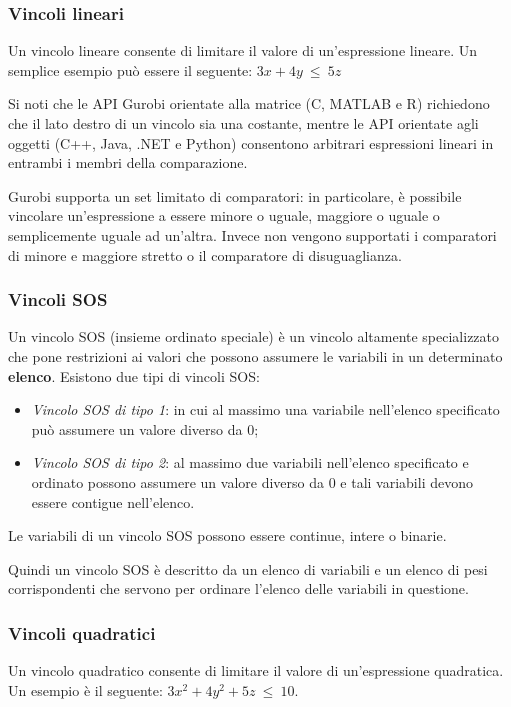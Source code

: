 \subsubsection*{Vincoli lineari}
Un vincolo lineare consente di limitare il valore di un'espressione lineare.
Un semplice esempio può essere il seguente:
$3x + 4y ~ \leq ~ 5z$

Si noti che le API Gurobi orientate alla matrice (C, MATLAB e R) richiedono che il lato destro di un vincolo sia una costante, mentre le API orientate agli oggetti (C++, Java, .NET e Python) consentono arbitrari espressioni lineari in entrambi i membri della comparazione.

Gurobi supporta un set limitato di comparatori: in particolare, è possibile vincolare un'espressione a essere minore o uguale, maggiore o uguale o semplicemente uguale ad un'altra. Invece non vengono supportati i comparatori di minore e maggiore stretto o il comparatore di disuguaglianza. 

\subsubsection*{Vincoli SOS}
Un vincolo SOS (insieme ordinato speciale) è un vincolo altamente specializzato che pone restrizioni ai valori che possono assumere le variabili in un determinato \textbf{elenco}.
Esistono due tipi di vincoli SOS:
\begin{itemize}
\item \textit{Vincolo SOS di tipo 1}: in cui al massimo una variabile nell'elenco specificato può assumere un valore diverso da 0;
\item \textit{Vincolo SOS di tipo 2}: al massimo due variabili nell'elenco specificato e ordinato possono assumere un valore diverso da 0 e tali variabili devono essere contigue nell'elenco.
\end{itemize}
Le variabili di un vincolo SOS possono essere continue, intere o binarie.

Quindi un vincolo SOS è descritto da un elenco di variabili e un elenco di pesi corrispondenti che servono per ordinare l'elenco delle variabili in questione.

\subsubsection*{Vincoli quadratici}
Un vincolo quadratico consente di limitare il valore di un'espressione quadratica.
Un esempio è il seguente:
$3x^2 + 4y^2 + 5z ~ \leq ~ 10$.

